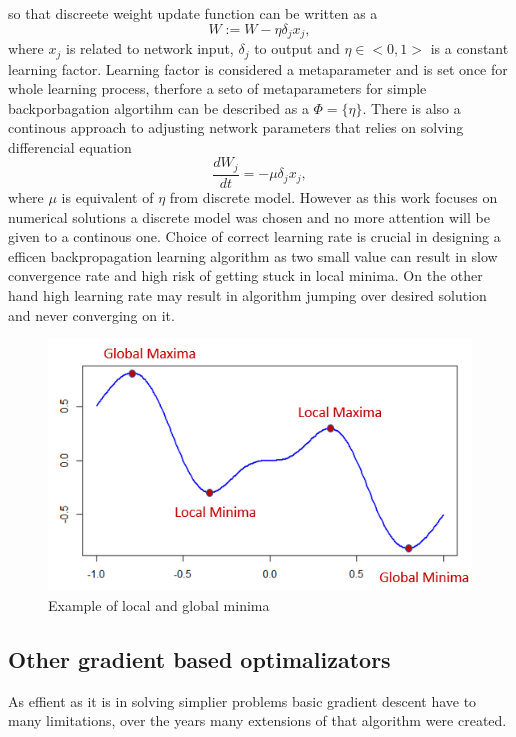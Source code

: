 so that discreete weight update function can be written as a 
\begin{equation}
	W := W - \eta \delta_{j} x_{j},
\end{equation}
where $x_{j}$ is related to network input,  $\delta_{j}$ to output and $\eta \in <0,1>$ is a 
constant learning factor.
Learning factor is considered a metaparameter and is set once for whole learning process, 
therfore a seto of metaparameters for simple backporbagation algortihm can be described as 
a $\Phi = \{\eta \}$. There is also a continous approach to adjusting network parameters that
relies on solving differencial equation
\begin{equation}
	\frac{dW_{j}}{dt} = -\mu \delta_{j} x_{j},
\end{equation}
where $\mu$ is equivalent of $\eta$ from discrete model. However as this work focuses on 
numerical solutions a discrete model was chosen and no more attention will be given to a 
continous one.
Choice of correct learning rate is crucial in designing a efficen backpropagation 
learning algorithm as two small value can result in slow convergence rate and high risk of 
getting stuck in local minima. On the other hand high learning rate may result in algorithm
jumping over desired solution and never converging on it. 
\begin{figure}[ht] 
	\centering
	\includegraphics[width=\textwidth]{res/local_minima}
	\caption{Example of local and global minima}
	\label{fig:local_minima}
\end{figure}

\subsection{Other gradient based optimalizators}
As effient as it is in solving simplier problems basic gradient descent have to many limitations,
over the years many extensions of that algorithm were created.

